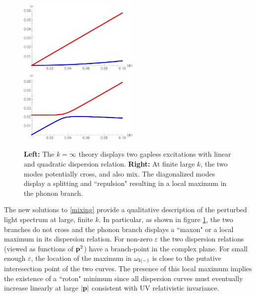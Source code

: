 \begin{figure}[h]
\begin{center}
\includegraphics[width=2.3in]{Chapter_3_Folder_1806.06976/figures/crossing0.pdf}\hspace{0.8in}\includegraphics[width=2.3in]{Chapter_3_Folder_1806.06976/figures/crossing.pdf}
\end{center}
\caption{ {\bf Left:} The $k=\infty$ theory displays two gapless excitations with linear and quadratic dispersion relation. {\bf Right:} At finite large $k$, the two modes potentially cross, and also mix. The diagonalized modes display  a splitting and ``repulsion" resulting in a local maximum in the phonon branch.
}\label{cross}
\end{figure}
The new solutions to \eqref{mixing} provide a qualitative description of the perturbed light spectrum at large, finite $k$.  
In particular, as shown in figure \ref{cross}, the two branches do not cross and the phonon branch displays a ``maxon" or a local maximum in its dispersion relation.  
For non-zero $\varepsilon$ the two dispersion relations (viewed as functions of ${\bf p}^2$) have a branch-point in the complex plane. For small enough $\varepsilon$, the location of the maximum in $\omega_{\rm I(-)}$ is close to the putative interesection point of the two curves.
The presence of this local maximum implies the existence of a ``roton" minimum since all dispersion curves must eventually increase linearly at large $|{\bf p}|$ consistent with UV relativistic invariance. 


